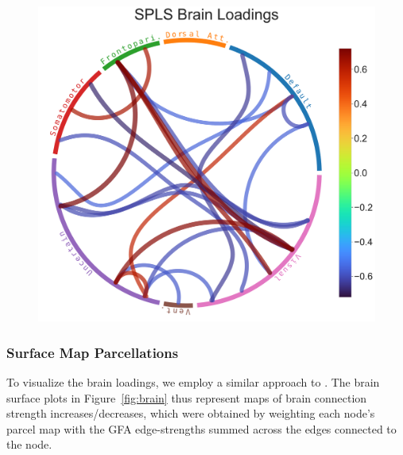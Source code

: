 \begin{figure}
\includegraphics[width=0.49\linewidth]{figures/regularization/hcp/SPLS brain loadings.pdf}
\caption{}\label{}
\end{figure}

\subsubsection{Surface Map Parcellations}
To visualize the brain loadings, we employ a similar approach to \citep{ferreira2022hierarchical, smith2015positive}.
The brain surface plots in Figure~\ref{fig:brain} thus represent maps of brain connection strength increases/decreases, which
were obtained by weighting each node’s parcel map with the GFA edge-strengths summed across the edges
connected to the node.

